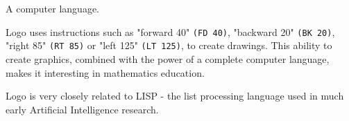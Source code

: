 A computer language.  
\par
Logo uses instructions such as "forward 40" \texttt{(FD~40)}, "backward 20" \texttt{(BK~20)}, "right 85" \texttt{(RT~85)} or "left 125" \texttt{(LT~125)}, to create drawings. This ability to create graphics, combined with the power of a complete computer language, makes it interesting in mathematics education.
 
\par
Logo is very closely related to LISP - the list processing language used in much early Artificial Intelligence research. 

  